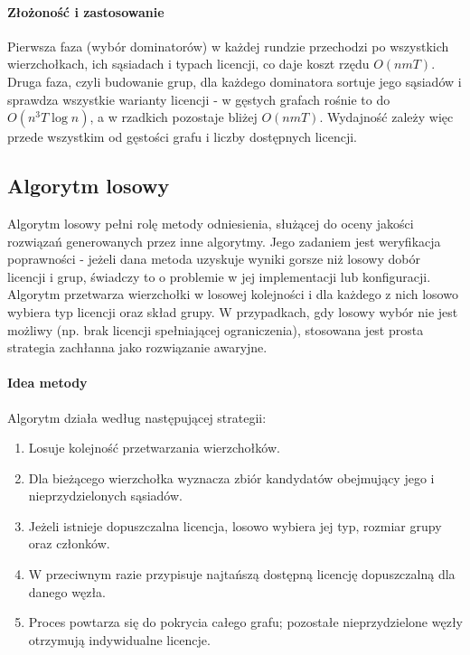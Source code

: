 \paragraph{Złożoność i zastosowanie} 
Pierwsza faza (wybór dominatorów) w każdej rundzie przechodzi po wszystkich wierzchołkach, ich sąsiadach i typach licencji, co daje koszt rzędu $O(n m T)$. Druga faza, czyli budowanie grup, dla każdego dominatora sortuje jego sąsiadów i sprawdza wszystkie warianty licencji - w gęstych grafach rośnie to do $O(n^3 T \log n)$, a w rzadkich pozostaje bliżej $O(n m T)$. Wydajność zależy więc przede wszystkim od gęstości grafu i liczby dostępnych licencji.

\subsection{Algorytm losowy}\label{subsec:random}

Algorytm losowy pełni rolę metody odniesienia, służącej do oceny jakości rozwiązań generowanych przez inne algorytmy. 
Jego zadaniem jest weryfikacja poprawności - jeżeli dana metoda uzyskuje wyniki gorsze niż losowy dobór licencji i grup, świadczy to o problemie w jej implementacji lub konfiguracji. 
Algorytm przetwarza wierzchołki w losowej kolejności i dla każdego z nich losowo wybiera typ licencji oraz skład grupy. 
W przypadkach, gdy losowy wybór nie jest możliwy (np. brak licencji spełniającej ograniczenia), stosowana jest prosta strategia zachłanna jako rozwiązanie awaryjne.

\paragraph{Idea metody}
Algorytm działa według następującej strategii:
\begin{enumerate}
  \item Losuje kolejność przetwarzania wierzchołków.
  \item Dla bieżącego wierzchołka wyznacza zbiór kandydatów obejmujący jego i nieprzydzielonych sąsiadów.
  \item Jeżeli istnieje dopuszczalna licencja, losowo wybiera jej typ, rozmiar grupy oraz członków.
  \item W przeciwnym razie przypisuje najtańszą dostępną licencję dopuszczalną dla danego węzła.
  \item Proces powtarza się do pokrycia całego grafu; pozostałe nieprzydzielone węzły otrzymują indywidualne licencje.
\end{enumerate}


